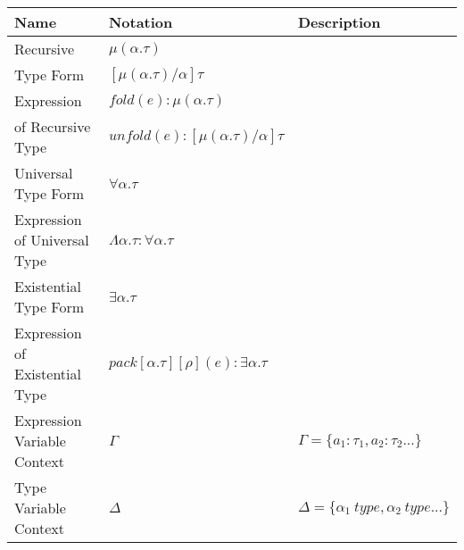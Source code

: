 \documentclass{article}
\begin{document}
\begin{table}[htp]
\begin{tabularx}
{\linewidth}
{|>{\RaggedRight}p{2.5cm}|x|x|}\hline
Name & Notation & Description\\ \hline
Recursive & $\mu(\alpha.\tau) $ &  \\
Type Form & $[\mu(\alpha.\tau)/\alpha]\tau$ & \\ \hline
Expression & $fold(e):\mu(\alpha.\tau)$ & \\ 
 of Recursive Type & $unfold(e):[\mu(\alpha.\tau)/\alpha]\tau$  & \\ \hline
Universal Type Form & $\forall\alpha.\tau$ &  \\ \hline
Expression of Universal Type & $\Lambda \alpha.\tau : \forall\alpha.\tau$ & \\ \hline
Existential Type Form & $\exists\alpha.\tau$ &  \\ \hline
Expression of Existential Type & $pack[\alpha.\tau][\rho](e):\exists\alpha.\tau$ & \\ \hline
Expression Variable Context & $\Gamma$ & $\Gamma = \{a_{1}:\tau_{1}, a_{2}:\tau_{2}...\}$ \\ \hline
Type Variable Context & $\Delta$ & $\Delta = \{\alpha_{1}\ type, \alpha_{2}\ type...\}$ \\ \hline
\end{tabularx}
\end{table}
\end{document}
